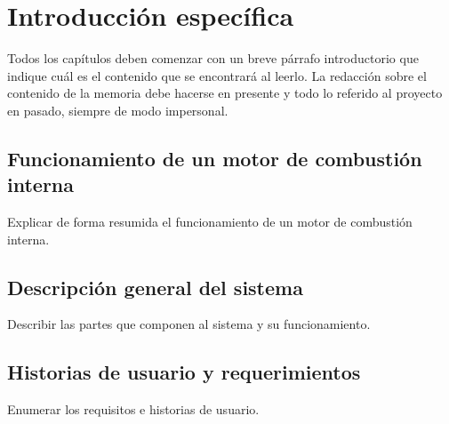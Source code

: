 \chapter{Introducción específica} %

\label{Chapter2}

Todos los capítulos deben comenzar con un breve párrafo introductorio que indique cuál es el contenido que se encontrará al leerlo.  La redacción sobre el contenido de la memoria debe hacerse en presente y todo lo referido al proyecto en pasado, siempre de modo impersonal.

\section{Funcionamiento de un motor de combustión interna}

Explicar de forma resumida el funcionamiento de un motor de combustión interna.

\section{Descripción general del sistema}

Describir las partes que componen al sistema y su funcionamiento.

\section{Historias de usuario y requerimientos}

Enumerar los requisitos e historias de usuario.